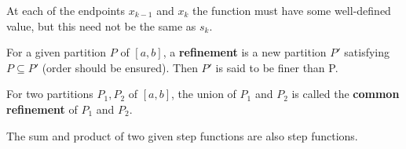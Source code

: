 \documentclass[a4paper]{ctexart}
\begin{document}
	\begin{myrmk}
		At each of the endpoints $x_{k-1}$ and $x_k$ the function must have some well-defined value, but this need not be the same as $s_k$.
	\end{myrmk}
	\begin{mydef}
		For a given partition $P$ of $[a,b]$, a \textbf{refinement} is a new partition $P'$ satisfying $P\subseteq P'$ (order should be ensured). Then $P'$ is said to be finer than P.
	\end{mydef}
	\begin{mydef}
		For two partitions $P_1,P_2$ of $[a,b]$, the union of $P_1$ and $P_2$ is called the \textbf{common refinement} of $P_1$ and $P_2$.
	\end{mydef}
	\begin{mythm}
		The sum and product of two given step functions are also step functions.
	\end{mythm}
	
\end{document}
